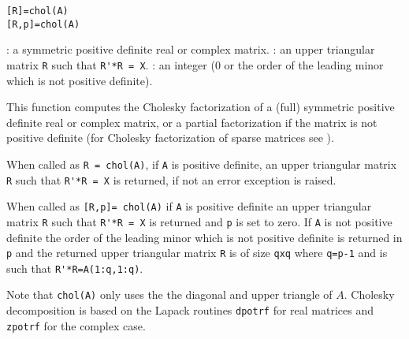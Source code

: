 
\begin{mandesc}
\end{mandesc}

\begin{calling_sequence}
\begin{verbatim}
[R]=chol(A)
[R,p]=chol(A)
\end{verbatim}
\end{calling_sequence}
\begin{parameters}
  \begin{varlist}
    : a symmetric positive definite real or complex matrix. 
    : an upper triangular matrix \verb+R+ such that \verb+R'*R = X+.
    : an integer (0 or the order of the leading minor which is 
not positive definite).
  \end{varlist}
\end{parameters}

\begin{mandescription}
This function computes the Cholesky factorization of a (full) symmetric positive 
definite real or complex matrix, or a partial factorization if the matrix is not 
positive definite (for Cholesky factorization of sparse matrices see  
).

When called as \verb+R = chol(A)+, if \verb+A+ is positive definite, an upper triangular 
matrix \verb+R+ such that \verb+R'*R = X+ is returned, if not an error exception is 
raised.

When called as \verb+[R,p]= chol(A)+ if \verb+A+ is positive definite an upper triangular 
matrix \verb+R+ such that \verb+R'*R = X+ is returned and \verb+p+ is set to zero. 
If \verb+A+ is not positive definite the order of the leading minor which is 
not positive definite is returned in \verb+p+ and the returned upper triangular matrix \verb+R+ is 
of size \verb+qxq+ where \verb+q=p-1+ and is such that \verb+R'*R=A(1:q,1:q)+.

Note that \verb+chol(A)+ only uses the the diagonal and upper triangle of $A$. 
Cholesky decomposition is based on the Lapack routines \verb+dpotrf+ for real 
matrices and \verb+zpotrf+ for the complex case.
\end{mandescription}

